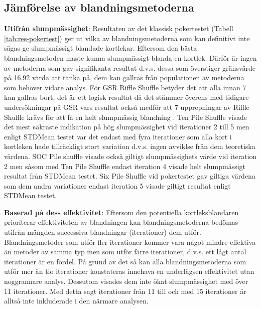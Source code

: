 \documentclass[swedish,a4paper]{article}
\begin{document}

\subsection{Jämförelse av blandningsmetoderna}
\label{sec:d_bm_jbm}
\textbf{Utifrån slumpmässighet}: Resultaten av det klassisk pokertestet (Tabell
\ref{tab:res-pokertest}) ger ut vilka av blandningsmetoderna som kan definitivt
inte sägas ge slumpmässigt blandade kortlekar.
Eftersom den bästa blandningsmetoden måste kunna slumpmässigt blanda en kortlek.
Därför är ingen av metoderna som gav signifikanta resultat d.v.s. dessa som
överstiger gränsvärde på 16.92 värda att tänka på, dem kan gallras från
populationen av metoderna som behöver vidare analys. För GSR Riffle Shuffle
betyder det att alla innan 7 kan gallras bort, det är ett logisk resultat då det
stämmer överens med tidigare undersökningar på GSR vars resultat också medför
att 7 upprepningar av Riffle Shuffle krävs för att få en helt slumpmässig
blandning \parencite{dovetaillair}. Ten Pile Shuffle visade det mest säkraste
indikation på hög slumpmässighet vid iterationer 2 till 5 men enligt
STDMean testet var det endast med fyra iterationer som alla kort i kortleken hade tillräckligt stort variation d.v.s. ingen avviklse från dem teoretiska värdena.
SOC Pile shuffle visade också giltigt slumpmässighets värde vid iteration 2 men
såsom med Ten Pile Shuffle endast iteration 4 visade helt slumpmässigt resultat
från STDMean testet. Six Pile Shuffle vid pokertestet gav giltiga värdena som
dem andra variationer endast iteration 5 visade giltigt resultat enligt STDMean
testet.  


\textbf{Baserad på dess effektivitet}: Eftersom 
den potentiella kortleksblandaren prioriterar effektiviteten av blandningen kan blandningsmetoderna bedömas utifrån mängden successiva blandningar (iterationer) dem utför. Blandningsmetoder som utför fler iterationer kommer vara något mindre effektiva än metoder av samma typ men som utför färre iterationer, d.v.s. ett lågt antal iterationer är en fördel. På grund av det så kan alla blandningsmetoderna som utför mer än tio iterationer konstateras innehava en underlägsen effektivitet utan noggrannare analys. Dessutom visades dem inte ökat slumpmässighet med över 11
iterationer. Med detta sagt iterationer från 11 till och med 15 iterationer är
alltså inte inkluderade i den närmare analysen.
\end{document}

